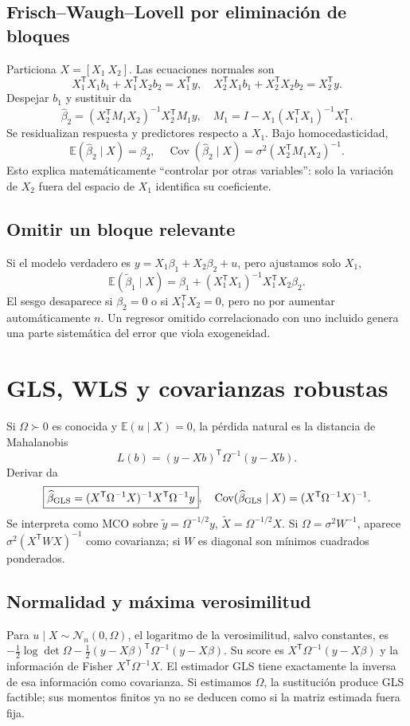 \documentclass[11pt,a4paper]{article}
\newcommand{\E}{\mathbb E}
\newcommand{\T}{^{\mathsf T}}
\DeclareMathOperator{\Cov}{Cov}
\theoremstyle{definition}
\begin{document}
\subsection{Frisch--Waugh--Lovell por eliminación de bloques}
Particiona $X=[X_1\ X_2]$. Las ecuaciones normales son
\[
X_1\T X_1b_1+X_1\T X_2b_2=X_1\T y,\quad
X_2\T X_1b_1+X_2\T X_2b_2=X_2\T y.
\]
Despejar $b_1$ y sustituir da
\[
\boxed{\widehat\beta_2=(X_2\T M_1X_2)^{-1}X_2\T M_1y},\quad
M_1=I-X_1(X_1\T X_1)^{-1}X_1\T.
\]
Se residualizan respuesta y predictores respecto a $X_1$. Bajo homocedasticidad,
\[
\E(\widehat\beta_2\mid X)=\beta_2,\quad
\Cov(\widehat\beta_2\mid X)=\sigma^2(X_2\T M_1X_2)^{-1}.
\]
Esto explica matemáticamente ``controlar por otras variables'': solo la variación de $X_2$ fuera del espacio de $X_1$ identifica su coeficiente.
\subsection{Omitir un bloque relevante}
Si el modelo verdadero es $y=X_1\beta_1+X_2\beta_2+u$, pero ajustamos solo $X_1$,
\[
\E(\widetilde\beta_1\mid X)=\beta_1+(X_1\T X_1)^{-1}X_1\T X_2\beta_2.
\]
El sesgo desaparece si $\beta_2=0$ o si $X_1\T X_2=0$, pero no por aumentar automáticamente $n$. Un regresor omitido correlacionado con uno incluido genera una parte sistemática del error que viola exogeneidad.

\section{GLS, WLS y covarianzas robustas}
Si $\Omega\succ0$ es conocida y $\E(u\mid X)=0$, la pérdida natural es la distancia de Mahalanobis
\[
L(b)=(y-Xb)\T\Omega^{-1}(y-Xb).
\]
Derivar da
\[
\boxed{\widehat\beta_{\rm GLS}=(X\T\Omega^{-1}X)^{-1}X\T\Omega^{-1}y},\quad
\Cov(\widehat\beta_{\rm GLS}\mid X)=(X\T\Omega^{-1}X)^{-1}.
\]
Se interpreta como MCO sobre $\widetilde y=\Omega^{-1/2}y$, $\widetilde X=\Omega^{-1/2}X$. Si $\Omega=\sigma^2W^{-1}$, aparece $\sigma^2(X\T WX)^{-1}$ como covarianza; si $W$ es diagonal son mínimos cuadrados ponderados.
\subsection{Normalidad y máxima verosimilitud}
Para $u\mid X\sim\mathcal N_n(0,\Omega)$, el logaritmo de la verosimilitud, salvo constantes, es $-\tfrac12\log\det\Omega-\tfrac12(y-X\beta)\T\Omega^{-1}(y-X\beta)$. Su score es $X\T\Omega^{-1}(y-X\beta)$ y la información de Fisher $X\T\Omega^{-1}X$. El estimador GLS tiene exactamente la inversa de esa información como covarianza. Si estimamos $\Omega$, la sustitución produce GLS factible; sus momentos finitos ya no se deducen como si la matriz estimada fuera fija.
\end{document}
